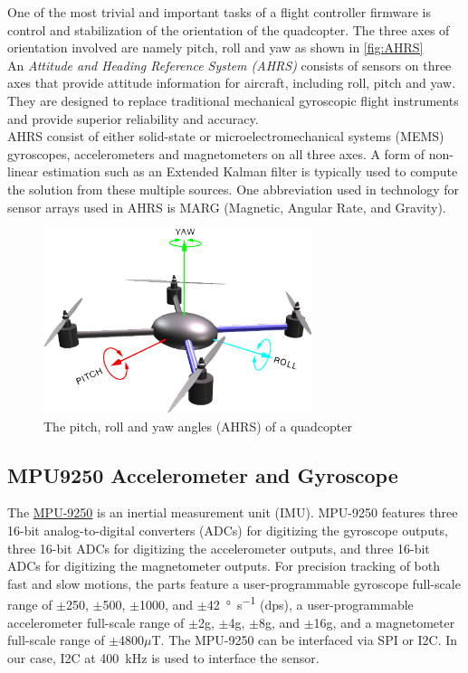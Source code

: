 \documentclass[a4paper,12pt,oneside]{book}
\begin{document}
One of the most trivial and important tasks of a flight controller firmware is control and stabilization of the orientation of the quadcopter. The three axes of orientation involved are namely pitch, roll and yaw as shown in \autoref{fig:AHRS}\\

An \textit{Attitude and Heading Reference System (AHRS)} consists of sensors on three axes that provide attitude information for aircraft, including roll, pitch and yaw. They are designed to replace traditional mechanical gyroscopic flight instruments and provide superior reliability and accuracy.\cite{ahrswiki}\\

AHRS consist of either solid-state or microelectromechanical systems (MEMS) gyroscopes, accelerometers and magnetometers on all three axes. A form of non-linear estimation such as an Extended Kalman filter is typically used to compute the solution from these multiple sources. One abbreviation used in technology for sensor arrays used in AHRS is MARG (Magnetic, Angular Rate, and Gravity).\cite{ahrswiki}\\

\begin{figure}[!htb]
\centering
\includegraphics[width=0.7\textwidth]{images/AHRS}
\caption{The pitch, roll and yaw angles (AHRS) of a quadcopter\cite{ardu}}
\label{fig:AHRS}
\end{figure}

\subsection{MPU9250 Accelerometer and Gyroscope}
The \href{./datasheets/MPU9250 Datasheet.pdf}{MPU-9250} is an inertial measurement unit (IMU). MPU-9250 features three 16-bit analog-to-digital converters (ADCs) for digitizing the gyroscope outputs, three 16-bit ADCs for digitizing the accelerometer outputs, and three 16-bit ADCs for digitizing the magnetometer outputs. For precision tracking of both fast and slow motions, the parts feature a user-programmable gyroscope full-scale range of $\pm$250, $\pm$500, $\pm$1000, and $\pm$\SI{42}{\degree\per\second} (dps), a user-programmable accelerometer full-scale range of $\pm$2g, $\pm$4g, $\pm$8g, and $\pm$16g, and a magnetometer full-scale range of $\pm$4800$\mu$T. The MPU-9250 can be interfaced via SPI or I2C. In our case, I2C at \SI{400}{\kilo\hertz} is used to interface the sensor.
\end{document}

